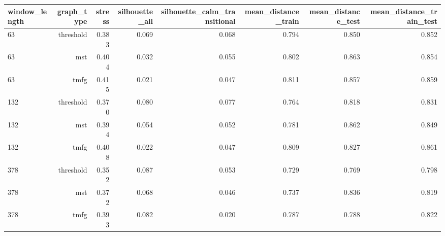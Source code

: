 \begin{tabular}{lrrrrrrr}
\toprule
window\_length & graph\_type & stress & silhouette\_all & silhouette\_calm\_transitional & mean\_distance\_train & mean\_distance\_test & mean\_distance\_train\_test \\
\midrule
63 & threshold & 0.383 & 0.069 & 0.068 & 0.794 & 0.850 & 0.852 \\
63 & mst & 0.404 & 0.032 & 0.055 & 0.802 & 0.863 & 0.854 \\
63 & tmfg & 0.415 & 0.021 & 0.047 & 0.811 & 0.857 & 0.859 \\
132 & threshold & 0.370 & 0.080 & 0.077 & 0.764 & 0.818 & 0.831 \\
132 & mst & 0.394 & 0.054 & 0.052 & 0.781 & 0.862 & 0.849 \\
132 & tmfg & 0.408 & 0.022 & 0.047 & 0.809 & 0.827 & 0.861 \\
378 & threshold & 0.352 & 0.087 & 0.053 & 0.729 & 0.769 & 0.798 \\
378 & mst & 0.372 & 0.068 & 0.046 & 0.737 & 0.836 & 0.819 \\
378 & tmfg & 0.393 & 0.082 & 0.020 & 0.787 & 0.788 & 0.822 \\
\bottomrule
\end{tabular}
